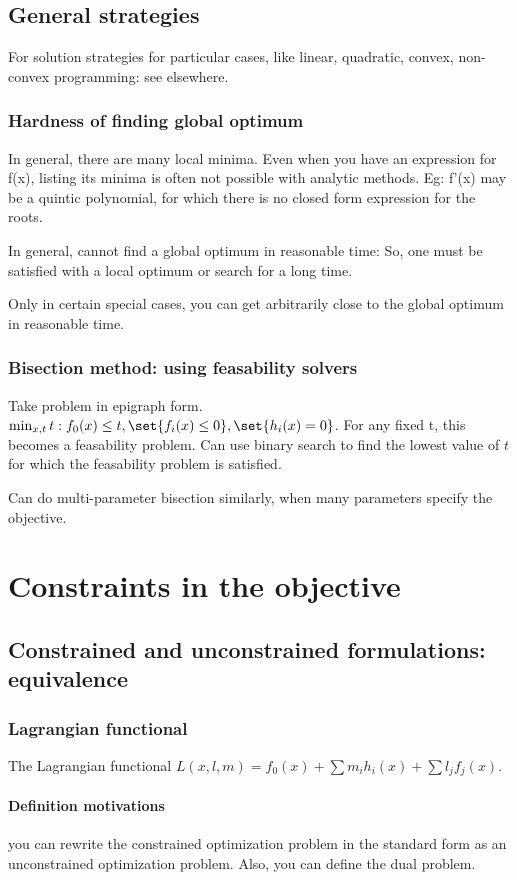 \documentclass[oneside, article]{memoir}
\begin{document}
\section{General strategies}
For solution strategies for particular cases, like linear, quadratic, convex, non-convex programming: see elsewhere.

\subsection{Hardness of finding global optimum}
In general, there are many local minima. Even when you have an expression for f(x), listing its minima is often not possible with analytic methods. Eg: f'(x) may be a quintic polynomial, for which there is no closed form expression for the roots.

In general, cannot find a global optimum in reasonable time: So, one must be satisfied with a local optimum or search for a long time.

Only in certain special cases, you can get arbitrarily close to the global optimum in reasonable time.

\subsection{Bisection method: using feasability solvers}
Take problem in epigraph form. $\min_{x,t} t: f_{0}(x) \leq t, \set{f_{i}(x) \leq 0}, \set{h_{i}(x) = 0} $. For any fixed t, this becomes a feasability problem. Can use binary search to find the lowest value of $t$ for which the feasability problem is satisfied.

Can do multi-parameter bisection similarly, when many parameters specify the objective.

\chapter{Constraints in the objective}
\section{Constrained and unconstrained formulations: equivalence}
\subsection{Lagrangian functional}
The Lagrangian functional \dfn $L(x, l, m) = f_{0}(x) + \sum m_{i}h_{i}(x) + \sum l_{j}f_{j}(x)$.

\subsubsection{Definition motivations}
you can rewrite the constrained optimization problem in the standard form as an unconstrained optimization problem. Also, you can define the dual problem.
\end{document}
